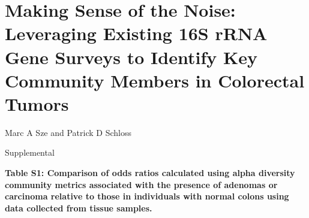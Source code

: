 \documentclass[12pt,]{article}
\title{}
\author{}
\date{}
\begin{document}
\section{Making Sense of the Noise: Leveraging Existing 16S rRNA Gene
Surveys to Identify Key Community Members in Colorectal
Tumors}\label{making-sense-of-the-noise-leveraging-existing-16s-rrna-gene-surveys-to-identify-key-community-members-in-colorectal-tumors}

\vspace{10mm}

\begin{center}
Marc A Sze and Patrick D Schloss

\vspace{10mm}

Supplemental
\end{center}

\newpage

\textbf{Table S1: Comparison of odds ratios calculated using alpha
diversity community metrics associated with the presence of adenomas or
carcinoma relative to those in individuals with normal colons using data
collected from tissue samples.}

\footnotesize
\end{document}
